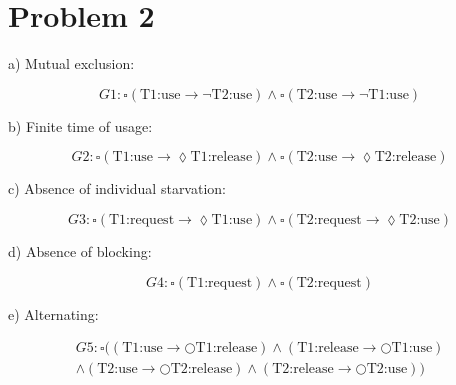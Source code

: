 \section{Problem 2}

a) Mutual exclusion:

\[G1: \square (\text{T1:use} \rightarrow \neg \text{T2:use}) \land \square (\text{T2:use} \rightarrow \neg \text{T1:use})\]

b) Finite time of usage:

\[G2: \square (\text{T1:use} \rightarrow \lozenge \text{T1:release}) \land \square (\text{T2:use} \rightarrow \lozenge \text{T2:release})\]

c) Absence of individual starvation:

\[G3: \square (\text{T1:request} \rightarrow \lozenge \text{T1:use}) \land \square (\text{T2:request} \rightarrow \lozenge \text{T2:use})\]

d) Absence of blocking:

\[G4: \square (\text{T1:request}) \land \square (\text{T2:request})\]

e) Alternating:

\begin{equation}
    \begin{aligned}
        G5: \square ((\text{T1:use} \rightarrow \bigcirc \text{T1:release}) \land (\text{T1:release} \rightarrow \bigcirc \text{T1:use})\\
\land (\text{T2:use} \rightarrow \bigcirc \text{T2:release}) \land (\text{T2:release} \rightarrow \bigcirc \text{T2:use}))\nonumber
    \end{aligned}
\end{equation}